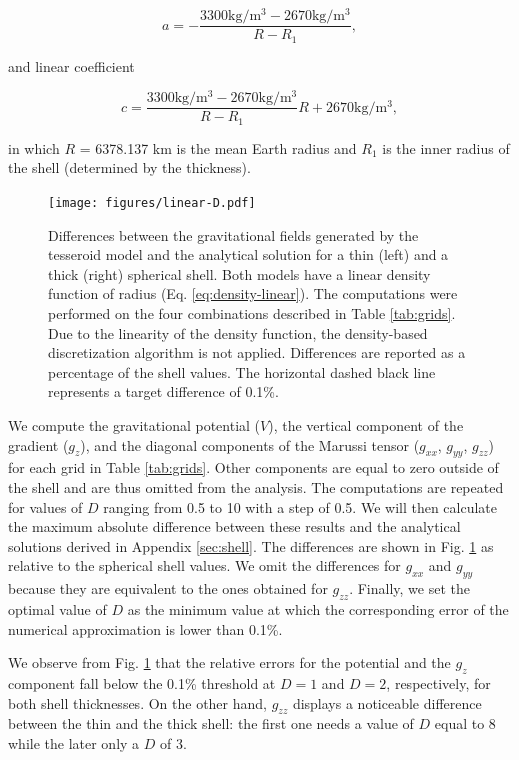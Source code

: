 \documentclass[extra, referee]{gji}
\begin{document}
\begin{equation}
    a = -\frac{3300\text{kg/m$^3$} - 2670\text{kg/m$^3$}}{R - R_1},
\end{equation}

\noindent and linear coefficient

\begin{equation}
    c = \frac{3300\text{kg/m$^3$} -
        2670\text{kg/m$^3$}}{R - R_1} R +
        2670\text{kg/m$^3$},
\end{equation}

\noindent
in which $R$ = 6378.137 km is the mean Earth radius and $R_1$ is the inner radius of the
shell (determined by the thickness).

\begin{figure}
\centering
\texttt{[image: figures/linear-D.pdf]}
\caption{
    Differences between the gravitational fields generated by the tesseroid model
    and the analytical solution for a thin (left) and a thick (right) spherical shell.
    Both models have a linear density function of radius (Eq. \ref{eq:density-linear}).
    The computations were performed on the four combinations described in
    Table \ref{tab:grids}.
    Due to the linearity of the density function, the density-based discretization
    algorithm is not applied.
    Differences are reported as a percentage of the shell values.
    The horizontal dashed black line represents a target difference of 0.1\%.
}
\label{fig:D-linear}
\end{figure}


We compute the gravitational potential ($V$), the vertical component of the gradient
($g_z$), and the diagonal components of the Marussi tensor ($g_{xx}$, $g_{yy}$,
$g_{zz}$) for each grid in Table \ref{tab:grids}.
Other components are equal to zero outside of the shell and are thus omitted from the
analysis.
The computations are repeated for values of $D$ ranging from 0.5 to 10 with a step of
0.5.
We will then calculate the maximum absolute difference between these results and the
analytical solutions derived in Appendix \ref{sec:shell}.
The differences are shown in Fig. \ref{fig:D-linear} as relative to the spherical shell
values.
We omit the differences for $g_{xx}$ and $g_{yy}$ because they are equivalent to the
ones obtained for $g_{zz}$.
Finally, we set the optimal value of $D$ as the minimum value at which the corresponding
error of the numerical approximation is lower than 0.1\%.

We observe from Fig. \ref{fig:D-linear} that the relative errors for the
potential and the $g_z$ component fall below the 0.1\% threshold at
$D=1$ and $D=2$, respectively, for both shell thicknesses.
On the other hand, $g_{zz}$ displays a noticeable
difference between the thin and the thick shell: the first one needs a
value of $D$ equal to 8 while the later only a $D$ of 3.
\end{document}
